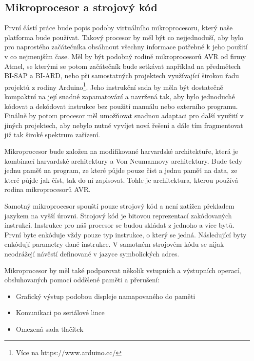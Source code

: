\subsection{Mikroprocesor a strojový kód}

První částí práce bude popis podoby virtuálního mikroprocesoru, který naše platforma bude používat. Takový procesor by měl být co nejjednoduší, aby bylo pro naprostého začátečníka obsáhnout všechny informace potřebné k jeho použití v co nejmenjším čase. Měl by být podobný rodině mikroprocesorů AVR od firmy Atmel, se kterými se potom začátečník bude setkávat například na předmětech BI-SAP a BI-ARD, nebo při samostatných projektech využívající širokou řadu projektů z rodiny Arduino\footnote{Více na https://www.arduino.cc/}. Jeho instrukční sada by měla být dostatečně kompaktní na její snadné zapamatování a navržená tak, aby bylo jednoduché kódovat a dekódovat instrukce bez použití manuálu nebo externího programu. Finálně by potom procesor měl umožňovat snadnou adaptaci pro další využití v jiných projektech, aby nebylo nutné vyvíjet nová řešení a dále tím fragmentovat již tak široké spektrum zařízení.

Mikroprocesor bude založen na modifikované harvardské architektuře, která je kombinací harvardské architektury a Von Neumannovy architektury. Bude tedy jednu paměť na program, ze které půjde pouze číst a jednu paměť na data, ze které půjde jak číst, tak do ní zapisovat. Tohle je architektura, kterou používá rodina mikroprocesorů AVR\cite{attiny12-datasheet}.

Samotný mikroprocesor spouští pouze strojový kód a není zatížen překladem jazykem na vyšší úrovni. Strojový kód je bitovou reprezentací zakódovaných instrukcí. Instrukce pro náš procesor se budou skládat z jednoho a více bytů. První byte enkóduje vždy pouze typ instrukce, o který se jedná. Následující byty enkódují parametry dané instrukce. V samotném strojovém kódu se nijak neodrážejí návěstí definované v jazyce symbolických adres.

Mikroprocesor by měl také podporovat několik vstupních a výstupních operací, obsluhovaných pomocí oddělené paměti a přerušení:

\begin{itemize}
	\item Grafický výstup podobou displeje namapovaného do paměti
	\item Komunikaci po seriálové lince
	\item Omezená sada tlačítek
\end{itemize}

